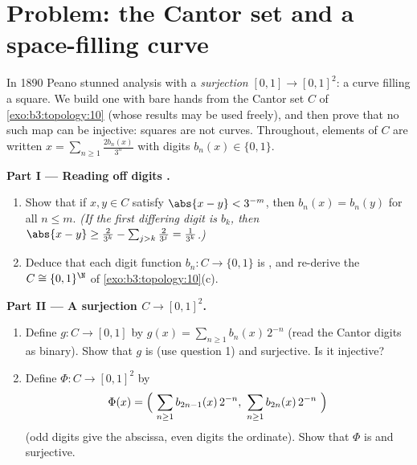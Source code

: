 \section{Problem: the Cantor set and a space-filling curve}

\begin{problem}\label{pb:b3:topology:1}
In 1890 Peano stunned analysis with a \emph{
surjection} $[0,1] \to [0,1]^2$: a curve filling a square. We
build one with bare hands from the Cantor set $C$ of
\cref{exo:b3:topology:10} (whose results may be used freely),
and then prove that no such map can be injective: squares are
not curves. Throughout, elements of $C$ are written $x =
\sum_{n \geq 1} \frac{2b_n(x)}{3^n}$ with digits $b_n(x) \in
\{0, 1\}$.

\medskip
\noindent\textbf{Part I --- Reading off digits .}
\begin{enumerate}
  \item Show that if $x, y \in C$ satisfy $\abs{x - y} <
        3^{-m}$, then $b_n(x) = b_n(y)$ for all $n \leq m$.
        \emph{(If the first differing digit is $b_k$, then
        $\abs{x - y} \geq \frac{2}{3^k} - \sum_{j>k}\frac2{3^j}
        = \frac1{3^k}$.)}
  \item Deduce that each digit function $b_n \colon C \to \{0,
        1\}$ is , and re-derive the  $C
        \cong \{0,1\}^\N$ of \cref{exo:b3:topology:10}(c).
\end{enumerate}

\medskip
\noindent\textbf{Part II --- A  surjection $C \to
[0,1]^2$.}
\begin{enumerate}[resume]
  \item Define $g \colon C \to [0,1]$ by $g(x) = \sum_{n\geq1}
        b_n(x)\,2^{-n}$ (read the Cantor digits as binary).
        Show that $g$ is  (use question 1) and
        surjective. Is it injective?
  \item Define $\Phi \colon C \to [0,1]^2$ by
        \[
        \Phi(x) = \Bigl(\ \sum_{n\geq1} b_{2n-1}(x)\,2^{-n},\
        \sum_{n\geq1} b_{2n}(x)\,2^{-n}\ \Bigr)
        \]
        (odd digits give the abscissa, even digits the
        ordinate). Show that $\Phi$ is  and
        surjective.
\end{enumerate}


\end{problem}

